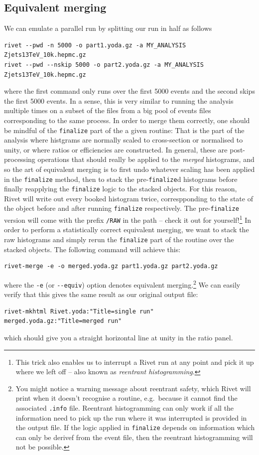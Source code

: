 \documentclass[10pt,fleqn]{scrartcl}
\theoremstyle{exstyle}
\begin{document}
\subsection{Equivalent merging}

We can emulate a parallel run by splitting our run in half as follows
\begin{verbatim}
rivet --pwd -n 5000 -o part1.yoda.gz -a MY_ANALYSIS Zjets13TeV_10k.hepmc.gz
rivet --pwd --nskip 5000 -o part2.yoda.gz -a MY_ANALYSIS Zjets13TeV_10k.hepmc.gz
\end{verbatim}
where the first command only runs over the first 5000 events and the second skips the first 5000 events.
In a sense, this is very similar to running the analysis multiple times on a subset of the files from a big
pool of events files corresponding to the same process.
In order to merge them correctly, one should be mindful of the \verb|finalize| part of the a given routine:
That is the part of the analysis where histgrams are normally scaled to cross-section or normalised to unity,
or where ratios or efficiencies are constructed. In general, these are post-processing operations that should
really be applied to the \emph{merged} histograms, and so the art of equivalent merging is to first undo
whatever scaling has been applied in the \verb|finalize| method, then to stack the
pre-\verb|finalize|d histograms before finally reapplying the \verb|finalize| logic to the stacked objects.
For this reason, Rivet will write out every booked histogram twice, correspponding to the state of the object
before and after running \verb|finalize| respectively. The pre-\verb|finalize| version will come with the
prefix \verb|/RAW| in the path -- check it out for yourself!\footnote{This trick also enables us to interrupt
a Rivet run at any point and pick it up where we left off -- also known as \emph{reentrant histogramming}.}
In order to perform a statistically correct equivalent merging, we want to stack the raw histograms and simply
rerun the \verb|finalize| part of the routine over the stacked objects. The following command will achieve this:
\begin{verbatim}
rivet-merge -e -o merged.yoda.gz part1.yoda.gz part2.yoda.gz
\end{verbatim}
where the \verb|-e| (or \verb|--equiv|) option denotes equivalent merging.\footnote{You might notice a warning
message about reentrant safety, which Rivet will print when it doesn't recognise a routine,
e.g.\ because it cannot find the associated \texttt{.info} file.
Reentrant histogramming can only work if all the information need to pick up the run where it was
interrupted is provided in the output file. If the logic applied in \texttt{finalize} depends on information
which can only be derivef from the event file, then the reentrant histogramming will not be possible.}
We can easily verify that this gives the same result as our original output file:
\begin{footnotesize}
\begin{verbatim}
rivet-mkhtml Rivet.yoda:"Title=single run" merged.yoda.gz:"Title=merged run"
\end{verbatim}
\end{footnotesize}
which should give you a straight horizontal line at unity in the ratio panel.
\end{document}
